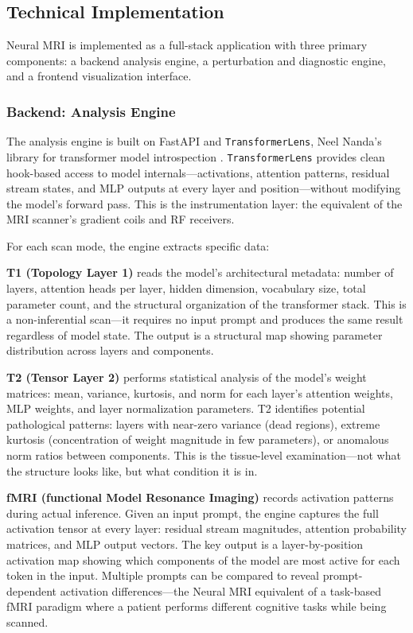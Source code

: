 \documentclass[11pt]{article}
\begin{document}
\subsection{Technical Implementation}

Neural MRI is implemented as a full-stack application with three primary components: a backend analysis engine, a perturbation and diagnostic engine, and a frontend visualization interface.

\subsubsection{Backend: Analysis Engine}

The analysis engine is built on FastAPI and \texttt{TransformerLens}, Neel Nanda's library for transformer model introspection \citep{Nanda2022}. \texttt{TransformerLens} provides clean hook-based access to model internals---activations, attention patterns, residual stream states, and MLP outputs at every layer and position---without modifying the model's forward pass. This is the instrumentation layer: the equivalent of the MRI scanner's gradient coils and RF receivers.

For each scan mode, the engine extracts specific data:

\textbf{T1 (Topology Layer 1)} reads the model's architectural metadata: number of layers, attention heads per layer, hidden dimension, vocabulary size, total parameter count, and the structural organization of the transformer stack. This is a non-inferential scan---it requires no input prompt and produces the same result regardless of model state. The output is a structural map showing parameter distribution across layers and components.

\textbf{T2 (Tensor Layer 2)} performs statistical analysis of the model's weight matrices: mean, variance, kurtosis, and norm for each layer's attention weights, MLP weights, and layer normalization parameters. T2 identifies potential pathological patterns: layers with near-zero variance (dead regions), extreme kurtosis (concentration of weight magnitude in few parameters), or anomalous norm ratios between components. This is the tissue-level examination---not what the structure looks like, but what condition it is in.

\textbf{fMRI (functional Model Resonance Imaging)} records activation patterns during actual inference. Given an input prompt, the engine captures the full activation tensor at every layer: residual stream magnitudes, attention probability matrices, and MLP output vectors. The key output is a layer-by-position activation map showing which components of the model are most active for each token in the input. Multiple prompts can be compared to reveal prompt-dependent activation differences---the Neural MRI equivalent of a task-based fMRI paradigm where a patient performs different cognitive tasks while being scanned.
\end{document}
